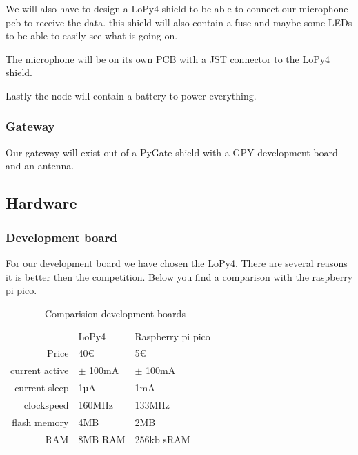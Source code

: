             We will also have to design a LoPy4 shield to be able to connect our microphone pcb
            to receive the data. this shield will also contain a fuse and maybe some LEDs
            to be able to easily see what is going on.
            
            The microphone will be on its own PCB with a JST connector to the LoPy4 shield.
            
            Lastly the node will contain a battery to power everything.
            
        \subsubsection{Gateway}
            Our gateway will exist out of a PyGate shield with a GPY development board and 
            an antenna.
        
    \newpage
    
    \subsection{Hardware}
        \subsubsection{Development board}
            For our development board we have chosen the \href{https://pycom.io/product/lopy4/}{LoPy4}. There are several reasons
            it is better then the competition. Below you find a comparison with the 
            raspberry pi pico.
            
            \begin{table}[h]\centering
            \caption{Comparision development boards}\label{tab:development_boards}
                \begin{tabular}{rlll}
                \toprule
                                    &   LoPy4               &	Raspberry pi pico  \\   
                    Price           &   40\euro{}           &	5\euro{} \\
                    current active 	&  $\pm$ 100mA           &	 $\pm$ 100mA \\	   
                    current sleep   &   1µA                 &	1mA \\
                    clockspeed      &   160MHz              &	133MHz \\
                    flash memory    &   4MB                 &   2MB \\
                    RAM             &   8MB RAM             &  256kb sRAM \\
                \bottomrule
                \end{tabular}
            \end{table}
            

